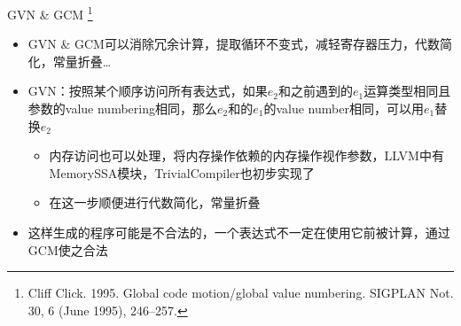 \documentclass{beamer}
\begin{document}
\begin{frame}{GVN \& GCM \footnote[1]{Cliff Click. 1995. Global code motion/global value numbering. SIGPLAN Not. 30, 6 (June 1995), 246–257.}}
\begin{itemize}
  \item GVN \& GCM可以消除冗余计算，提取循环不变式，减轻寄存器压力，代数简化，常量折叠\ldots
  \item GVN：按照某个顺序访问所有表达式，如果$e_2$和之前遇到的$e_1$运算类型相同且参数的value numbering相同，那么$e_2$和的$e_1$的value number相同，可以用$e_1$替换$e_2$
  \begin{itemize}
    \item 内存访问也可以处理，将内存操作依赖的内存操作视作参数，LLVM中有MemorySSA模块，TrivialCompiler也初步实现了
    \item 在这一步顺便进行代数简化，常量折叠
  \end{itemize}
  \item 这样生成的程序可能是不合法的，一个表达式不一定在使用它前被计算，通过GCM使之合法
\end{itemize}
\end{frame}
\end{document}
